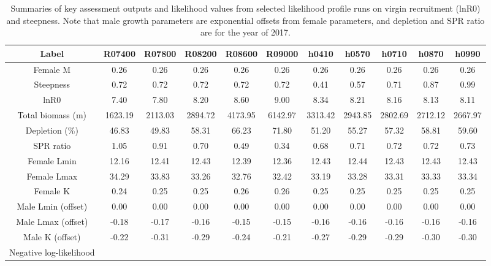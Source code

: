 \documentclass[12pt,]{article}
\begin{document}
\begin{landscape}
\begin{table}[ht]
\centering
\caption{Summaries of key assessment outputs 
                                              and likelihood values from selected 
                                              likelihood profile runs on virgin 
                                              recruitment (lnR0) and steepness.  Note that male 
                                              growth parameters are exponential 
                                              offsets from female parameters, and 
                                              depletion and SPR ratio are for the year of 2017.} 
\label{tab:like_profiles}
\begin{tabular}{c|ccccc|ccccc}
  \hline
Label & R07400 & R07800 & R08200 & R08600 & R09000 & h0410 & h0570 & h0710 & h0870 & h0990 \\ 
  \hline
Female M & 0.26 & 0.26 & 0.26 & 0.26 & 0.26 & 0.26 & 0.26 & 0.26 & 0.26 & 0.26 \\ 
  Steepness & 0.72 & 0.72 & 0.72 & 0.72 & 0.72 & 0.41 & 0.57 & 0.71 & 0.87 & 0.99 \\ 
  lnR0 & 7.40 & 7.80 & 8.20 & 8.60 & 9.00 & 8.34 & 8.21 & 8.16 & 8.13 & 8.11 \\ 
  Total biomass (m) & 1623.19 & 2113.03 & 2894.72 & 4173.95 & 6142.97 & 3313.42 & 2943.85 & 2802.69 & 2712.12 & 2667.97 \\ 
  Depletion (\%) & 46.83 & 49.83 & 58.31 & 66.23 & 71.80 & 51.20 & 55.27 & 57.32 & 58.81 & 59.60 \\ 
  SPR ratio & 1.05 & 0.91 & 0.70 & 0.49 & 0.34 & 0.68 & 0.71 & 0.72 & 0.72 & 0.73 \\ 
  Female Lmin & 12.16 & 12.41 & 12.43 & 12.39 & 12.36 & 12.43 & 12.44 & 12.43 & 12.43 & 12.43 \\ 
  Female Lmax & 34.29 & 33.83 & 33.26 & 32.76 & 32.42 & 33.19 & 33.28 & 33.31 & 33.33 & 33.34 \\ 
  Female K & 0.24 & 0.25 & 0.25 & 0.26 & 0.26 & 0.25 & 0.25 & 0.25 & 0.25 & 0.25 \\ 
  Male Lmin (offset) & 0.00 & 0.00 & 0.00 & 0.00 & 0.00 & 0.00 & 0.00 & 0.00 & 0.00 & 0.00 \\ 
  Male Lmax (offset) & -0.18 & -0.17 & -0.16 & -0.15 & -0.15 & -0.16 & -0.16 & -0.16 & -0.16 & -0.16 \\ 
  Male K (offset) & -0.22 & -0.31 & -0.29 & -0.24 & -0.21 & -0.27 & -0.29 & -0.29 & -0.30 & -0.30 \\ 
  Negative log-likelihood &  &  &  &  &  &  &  &  &  &  \\ 

\end{tabular}
\end{table}
\end{landscape}
\end{document}
